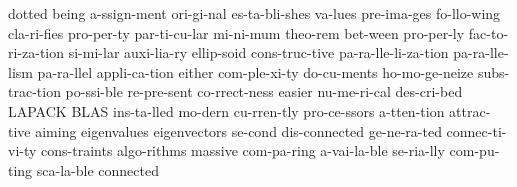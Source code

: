 \hyphenation
{
dotted
being
a-ssign-ment
ori-gi-nal 
es-ta-bli-shes 
va-lues 
pre-ima-ges 
fo-llo-wing
cla-ri-fies
pro-per-ty
par-ti-cu-lar
mi-ni-mum
theo-rem
bet-ween
pro-per-ly
fac-to-ri-za-tion
si-mi-lar
auxi-lia-ry
ellip-soid
cons-truc-tive
pa-ra-lle-li-za-tion
pa-ra-lle-lism
pa-ra-llel
appli-ca-tion
either
com-ple-xi-ty
do-cu-ments
ho-mo-ge-neize
subs-trac-tion
po-ssi-ble
re-pre-sent
co-rrect-ness
easier
nu-me-ri-cal
des-cri-bed
LAPACK
BLAS
ins-ta-lled
mo-dern
cu-rren-tly
pro-ce-ssors
a-tten-tion
attrac-tive
aiming
eigenvalues
eigenvectors
se-cond
dis-connected
ge-ne-ra-ted
connec-ti-vi-ty
cons-traints
algo-rithms
massive
com-pa-ring
a-vai-la-ble
se-ria-lly
com-pu-ting
sca-la-ble
connected
}
